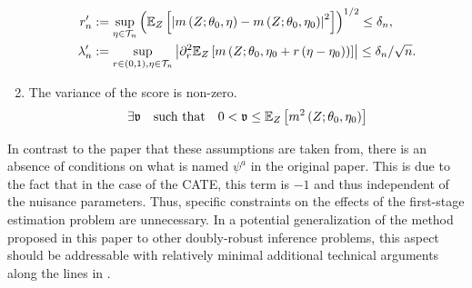 \begin{boxD}
\begin{asm}
\begin{enumerate}
\begin{align}
                r_{n}^{\prime}
                & :=\sup_{\eta \in \mathcal{T}_{n}}\left(\mathbb{E}_{Z}\left[\left|m\left(Z; \theta_0, \eta\right)-m\left(Z; \theta_0, \eta_0\right)\right|^2\right]\right)^{1 / 2} 
                \leq \delta_{n}, \\
                \lambda_{n}^{\prime}
                & :=\sup_{r \in(0,1), \eta \in \mathcal{T}_{n}}\left|\partial_r^2 \mathbb{E}_{Z}\left[m\left(Z; \theta_0, \eta_0+r\left(\eta-\eta_0\right)\right)\right]\right| 
                \leq \delta_{n} / \sqrt{n} .
            \end{align}
            \item The variance of the score is non-zero.
            \begin{equation}
                \exists \mathfrak{v} \quad \text{such that} \quad 
                0 < \mathfrak{v} \leq \mathbb{E}_{Z}\left[m^{2}\left(Z; \theta_0, \eta_0\right)\right]
            \end{equation}
        \end{enumerate}
    \end{asm}    
\end{boxD}
In contrast to the paper that these assumptions are taken from, there is an absence of conditions on what is named $\psi^{a}$ in the original paper.   This is due to the fact that in the case of the CATE, this term is $-1$ and thus independent of the nuisance parameters.
Thus, specific constraints on the effects of the first-stage estimation problem are unnecessary.
In a potential generalization of the method proposed in this paper to other doubly-robust inference problems, this aspect should be addressable with relatively minimal additional technical arguments along the lines in \citet{chernozhukov_doubledebiased_2018}.

